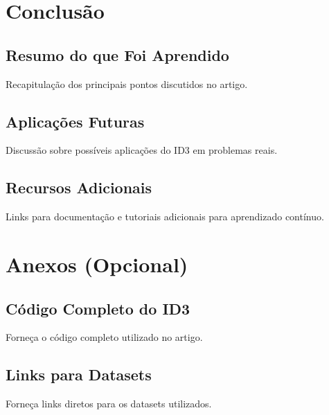 \documentclass{article}
\begin{document}
\section{Conclusão}
\subsection{Resumo do que Foi Aprendido}
Recapitulação dos principais pontos discutidos no artigo.

\subsection{Aplicações Futuras}
Discussão sobre possíveis aplicações do ID3 em problemas reais.

\subsection{Recursos Adicionais}
Links para documentação e tutoriais adicionais para aprendizado contínuo.

\section*{Anexos (Opcional)}
\subsection*{Código Completo do ID3}
Forneça o código completo utilizado no artigo.

\subsection*{Links para Datasets}
Forneça links diretos para os datasets utilizados.
\end{document}
